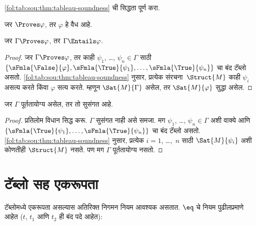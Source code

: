 \begin{prob}
\ref{fol:tab:sou:thm:tableau-soundness} ची सिद्धता पूर्ण करा.
\end{prob}




\begin{cor}
\label{fol:tab:sou:cor:weak-soundness}
जर $\Proves \varphi$, तर $\varphi$ हे वैध आहे.
\end{cor}

\begin{cor}
\label{fol:tab:sou:cor:entailment-soundness}
जर $\Gamma \Proves \varphi$, तर $\Gamma \Entails \varphi$.
\end{cor}

\begin{proof}
  जर $\Gamma \Proves \varphi$, तर काही $\psi_1$, \dots, $\psi_n \in
  \Gamma$ साठी $\{\sFmla{\False}{\varphi}, \sFmla{\True}{\psi_1}, \dots,
  \sFmla{\True}{\psi_n}\}$ चा बंद टॅब्लो असतो.
  \ref{fol:tab:sou:thm:tableau-soundness} नुसार, प्रत्येक
  संरचना~$\Struct{M}$
  काही $\psi_i$ असत्य करते किंवा $\varphi$ सत्य करते. म्हणून
  $\Sat{M}{\Gamma}$ असेल, तर
  $\Sat{M}{\varphi}$ सुद्धा असेल.
\end{proof}

\begin{cor}
\label{fol:tab:sou:cor:consistency-soundness}
जर $\Gamma$ पूर्ततायोग्य असेल, तर तो सुसंगत आहे.
\end{cor}

\begin{proof}
प्रतिलोम विधान सिद्ध करू. $\Gamma$ सुसंगत नाही असे समजा. मग
$\psi_1$, \dots, $\psi_n \in \Gamma$ अशी वाक्ये आणि
$\{\sFmla{\True}{\psi_1}, \dots, \sFmla{\True}{\psi_n}\}$ चा बंद
टॅब्लो असतो. \ref{fol:tab:sou:thm:tableau-soundness} नुसार, प्रत्येक
$i=1$, \dots,~$n$ साठी $\Sat{M}{\psi_i}$ अशी
कोणतीही $\Struct{M}$ नसते. पण मग $\Gamma$
पूर्ततायोग्य नसतो.
\end{proof}












\section{टॅब्लो सह एकरूपता}\label{fol:tab:ide:sec}

टॅब्लोमध्ये एकरूपता असल्यास अतिरिक्त निगमन नियम आवश्यक असतात.
$\eq$ चे नियम पुढीलप्रमाणे आहेत ($t$, $t_1$ आणि $t_2$ ही बंद पदे आहेत):

